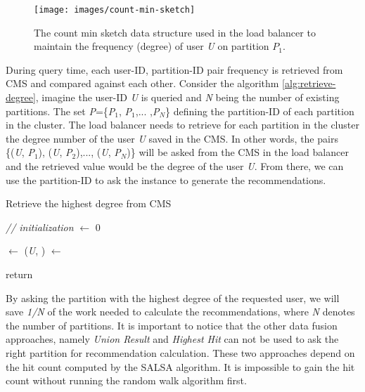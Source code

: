 \begin{figure}[!ht]
    \centering
    \texttt{[image: images/count-min-sketch]}
    \caption{The count min sketch data structure used in the load balancer to maintain the frequency (degree) of user \emph{U} on partition \emph{$P_1$}.}
    \label{fig:count-min-sketch}
\end{figure}


During query time, each user-ID, partition-ID pair frequency is retrieved from CMS and compared against each other. Consider the algorithm \ref{alg:retrieve-degree}, imagine the user-ID \emph{U} is queried and \emph{N} being the number of existing partitions. The set \emph{P}=\{\emph{P$_1$}, \emph{P$_1$},... ,\emph{P$_N$}\} defining the partition-ID of each partition in the cluster. The load balancer needs to retrieve for each partition in the cluster the degree number of the user \emph{U} saved in the CMS. In other words, the pairs \{(\emph{U}, \emph{P$_1$}), (\emph{U}, \emph{P$_2$}),..., (\emph{U}, \emph{P$_N$})\} will be asked from the CMS in the load balancer and the retrieved value would be the degree of the user \emph{U}. From there, we can use the partition-ID to ask the instance to generate the recommendations.


\begin{algorithm}[!ht]
    \caption{Retrieve the highest degree from CMS}
    \label{alg:retrieve-degree}




    \SetAlgoLined

    \BlankLine\emph{// initialization}\BlankLine
    \degree $\leftarrow$ 0 \;

    \BlankLine
    {
        \tuple $\leftarrow$ (\emph{U}, \partitionId)\;
        \count $\leftarrow$ \;
        \If{ \count $>$ \degree}{
                \degree $\leftarrow$ \count \;
                \partitionToAsk $\leftarrow$ $\partitionId$ \;
            }
    }

    return \partitionToAsk \;

    \BlankLine
\end{algorithm}


By asking the partition with the highest degree of the requested user, we will save \emph{1/N} of the work needed to calculate the recommendations, where \emph{N} denotes the number of partitions. It is important to notice that the other data fusion approaches, namely \emph{Union Result} and \emph{Highest Hit} can not be used to ask the right partition for recommendation calculation. These two approaches depend on the hit count computed by the SALSA algorithm. It is impossible to gain the hit count without running the random walk algorithm first.

